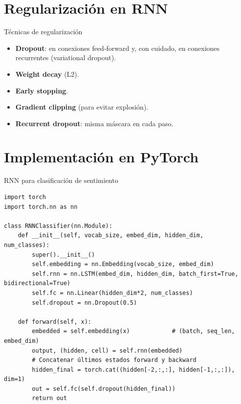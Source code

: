 \documentclass[aspectratio=169, 10pt, xcolor=table]{beamer}
\begin{document}
\section{Regularización en RNN}

\begin{frame}{Técnicas de regularización}
    \begin{itemize}
        \item \textbf{Dropout}: en conexiones feed-forward y, con cuidado, en conexiones recurrentes (variational dropout).
        \item \textbf{Weight decay} (L2).
        \item \textbf{Early stopping}.
        \item \textbf{Gradient clipping} (para evitar explosión).
        \item \textbf{Recurrent dropout}: misma máscara en cada paso.
    \end{itemize}
\end{frame}

\section{Implementación en PyTorch}

\begin{frame}[fragile]{RNN para clasificación de sentimiento}
    \begin{lstlisting}
import torch
import torch.nn as nn

class RNNClassifier(nn.Module):
    def __init__(self, vocab_size, embed_dim, hidden_dim, num_classes):
        super().__init__()
        self.embedding = nn.Embedding(vocab_size, embed_dim)
        self.rnn = nn.LSTM(embed_dim, hidden_dim, batch_first=True, bidirectional=True)
        self.fc = nn.Linear(hidden_dim*2, num_classes)
        self.dropout = nn.Dropout(0.5)

    def forward(self, x):
        embedded = self.embedding(x)            # (batch, seq_len, embed_dim)
        output, (hidden, cell) = self.rnn(embedded)
        # Concatenar últimos estados forward y backward
        hidden_final = torch.cat((hidden[-2,:,:], hidden[-1,:,:]), dim=1)
        out = self.fc(self.dropout(hidden_final))
        return out
    \end{lstlisting}
\end{frame}
\end{document}
